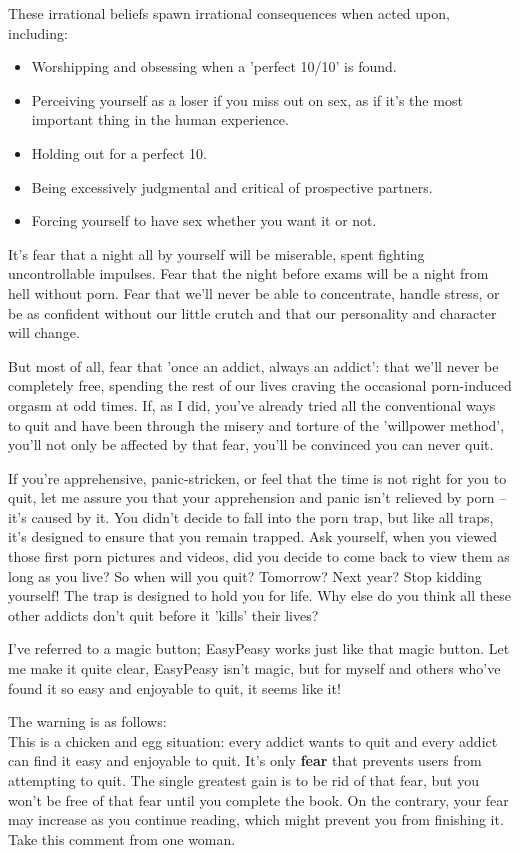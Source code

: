 \documentclass[
]{book}
\begin{document}
These irrational beliefs spawn irrational consequences when acted upon, including:

\begin{itemize}
\item
  Worshipping and obsessing when a 'perfect 10/10' is found.
\item
  Perceiving yourself as a loser if you miss out on sex, as if it's the most important thing in the human experience.
\item
  Holding out for a perfect 10.
\item
  Being excessively judgmental and critical of prospective partners.
\item
  Forcing yourself to have sex whether you want it or not.
\end{itemize}

It's fear that a night all by yourself will be miserable, spent fighting uncontrollable impulses. Fear that the night before exams will be a night from hell without porn. Fear that we'll never be able to concentrate, handle stress, or be as confident without our little crutch and that our personality and character will change.

But most of all, fear that 'once an addict, always an addict': that we'll never be completely free, spending the rest of our lives craving the occasional porn-induced orgasm at odd times. If, as I did, you've already tried all the conventional ways to quit and have been through the misery and torture of the 'willpower method', you'll not only be affected by that fear, you'll be convinced you can never quit.

If you're apprehensive, panic-stricken, or feel that the time is not right for you to quit, let me assure you that your apprehension and panic isn't relieved by porn -- it's caused by it. You didn't decide to fall into the porn trap, but like all traps, it's designed to ensure that you remain trapped. Ask yourself, when you viewed those first porn pictures and videos, did you decide to come back to view them as long as you live? So when will you quit? Tomorrow? Next year? Stop kidding yourself! The trap is designed to hold you for life. Why else do you think all these other addicts don't quit before it 'kills' their lives?

I've referred to a magic button; EasyPeasy works just like that magic button. Let me make it quite clear, EasyPeasy isn't magic, but for myself and others who've found it so easy and enjoyable to quit, it seems like it!

The warning is as follows:\\
This is a chicken and egg situation: every addict wants to quit and every addict can find it easy and enjoyable to quit. It's only \textbf{fear} that prevents users from attempting to quit. The single greatest gain is to be rid of that fear, but you won't be free of that fear until you complete the book. On the contrary, your fear may increase as you continue reading, which might prevent you from finishing it. Take this comment from one woman.
\end{document}
